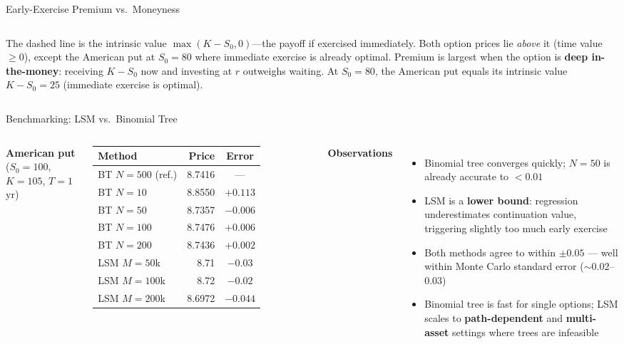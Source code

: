 \documentclass[aspectratio=169,10pt]{beamer}
\newcommand{\highlight}[1]{\textcolor{amred}{\textbf{#1}}}
\begin{document}
\begin{frame}{Early-Exercise Premium vs.\ Moneyness}
\begin{columns}[T]
      \bigskip
      \footnotesize
      The \textcolor{btgreen}{dashed line} is the intrinsic value
      $\max(K{-}S_0,0)$---the payoff if exercised immediately.
      Both option prices lie \emph{above} it (time value $\ge 0$),
      except the American put at $S_0=80$ where
      immediate exercise is already optimal.
      Premium is largest when the option is \textbf{deep in-the-money}:
      receiving $K-S_0$ now and investing at $r$ outweighs waiting.
      At $S_0=80$, the American put equals its intrinsic value
      $K-S_0=25$ (immediate exercise is optimal).
  \end{columns}
\end{frame}

\begin{frame}{Benchmarking: LSM vs.\ Binomial Tree}
  \begin{columns}[T]
      \textbf{American put} ($S_0=100$, $K=105$, $T=1$yr)

      \medskip
      \begin{tabular}{lrc}
        \toprule
        Method & Price & Error \\
        \midrule
        BT $N=500$ (ref.)  & 8.7416 & --- \\
        BT $N=10$           & 8.8550 & $+0.113$ \\
        BT $N=50$           & 8.7357 & $-0.006$ \\
        BT $N=100$          & 8.7476 & $+0.006$ \\
        BT $N=200$          & 8.7436 & $+0.002$ \\
        \midrule
        LSM $M=50$k  & 8.71   & $-0.03$ \\
        LSM $M=100$k & 8.72   & $-0.02$ \\
        LSM $M=200$k & 8.6972 & $-0.044$ \\
        \bottomrule
      \end{tabular}

      \textbf{Observations}
      \begin{itemize}
        \item Binomial tree converges quickly; $N=50$ is already accurate
              to $< 0.01$
        \item LSM is a \highlight{lower bound}: regression underestimates
              continuation value, triggering slightly too much early exercise
        \item Both methods agree to within $\pm 0.05$ — well within
              Monte Carlo standard error ($\sim 0.02$--$0.03$)
        \item Binomial tree is fast for single options; LSM scales to
              \textbf{path-dependent} and \textbf{multi-asset} settings
              where trees are infeasible
      \end{itemize}
  \end{columns}
\end{frame}
\end{document}
